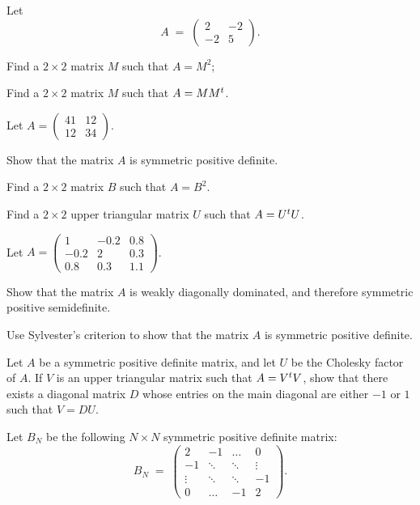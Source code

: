 \begin{exercises}

\item Let
\[
A \;=\; \begin{pmatrix} 2 & -2 \\ -2 & 5 \end{pmatrix}.
\]
\begin{subparts}
\item Find a $2 \times 2$ matrix $M$ such that $A = M^2$;
\item Find a $2 \times 2$ matrix $M$ such that $A = MM^{t}$.
\end{subparts}

\item Let $A = \begin{pmatrix} 41 & 12 \\ 12 & 34 \end{pmatrix}$.
\begin{subparts}
\item Show that the matrix $A$ is symmetric positive definite.
\item Find a $2 \times 2$ matrix $B$ such that $A = B^2$.
\item Find a $2 \times 2$ upper triangular matrix $U$ such that $A = U^{t} U$.
\end{subparts}

\item Let $A = \begin{pmatrix} 1 & -0.2 & 0.8 \\ -0.2 & 2 & 0.3 \\ 0.8 & 0.3 & 1.1
\end{pmatrix}$.
\begin{subparts}
\item Show that the matrix $A$ is weakly diagonally dominated, and therefore symmetric
positive semidefinite.
\item Use Sylvester's criterion to show that the matrix $A$ is symmetric positive
definite.
\end{subparts}

\item Let $A$ be a symmetric positive definite matrix, and let $U$ be the Cholesky
factor of $A$. If $V$ is an upper triangular matrix such that $A = V^{t} V$, show that
there exists a diagonal matrix $D$ whose entries on the main diagonal are either $-1$
or $1$ such that $V = DU$.

\item Let $B_N$ be the following $N \times N$ symmetric positive definite matrix:
\begin{equation}
B_N \;=\;
\begin{pmatrix}
2 & -1 & \dots & 0 \\
-1 & \ddots & \ddots & \vdots \\
\vdots & \ddots & \ddots & -1 \\
0 & \dots & -1 & 2
\end{pmatrix}.
\end{equation}


\end{exercises}
